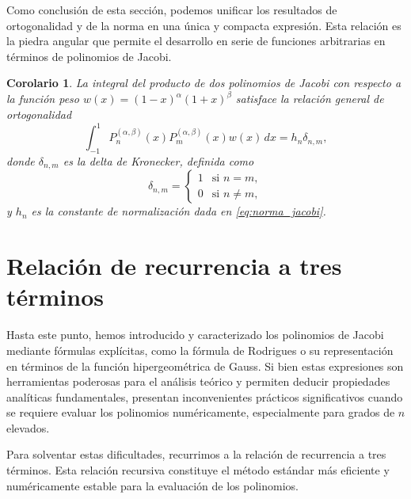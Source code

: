 \documentclass[12pt,a4paper]{book}
\newtheorem{corollary}[theorem]{Corolario}
\begin{document}
Como conclusión de esta sección, podemos unificar los resultados de ortogonalidad y de la norma en una única y compacta expresión. Esta relación es la piedra angular que permite el desarrollo en serie de funciones arbitrarias en términos de polinomios de Jacobi.

\begin{corollary}
La integral del producto de dos polinomios de Jacobi con respecto a la función peso $w(x) = (1-x)^\alpha (1+x)^\beta$ satisface la relación general de ortogonalidad
\[
    \int_{-1}^{1} P_n^{(\alpha, \beta)}(x) P_m^{(\alpha, \beta)}(x) w(x)  \, dx = h_n \delta_{n,m},
\]
donde $\delta_{n,m}$ es la delta de Kronecker, definida como
\[
\delta_{n,m} =
\begin{cases}
    1 & \text{si } n = m, \\
    0 & \text{si } n \neq m,
\end{cases}
\]
y $h_n$ es la constante de normalización dada en \eqref{eq:norma_jacobi}.
\end{corollary}

\section{Relación de recurrencia a tres términos}
\label{sec:recurrencia_jacobi}

Hasta este punto, hemos introducido y caracterizado los polinomios de Jacobi mediante fórmulas explícitas, como la fórmula de Rodrigues o su representación en términos de la función hipergeométrica de Gauss. Si bien estas expresiones son herramientas poderosas para el análisis teórico y permiten deducir propiedades analíticas fundamentales, presentan inconvenientes prácticos significativos cuando se requiere evaluar los polinomios numéricamente, especialmente para grados de $n$ elevados.

Para solventar estas dificultades, recurrimos a la relación de recurrencia a tres términos. Esta relación recursiva constituye el método estándar más eficiente y numéricamente estable para la evaluación de los polinomios.
\end{document}
